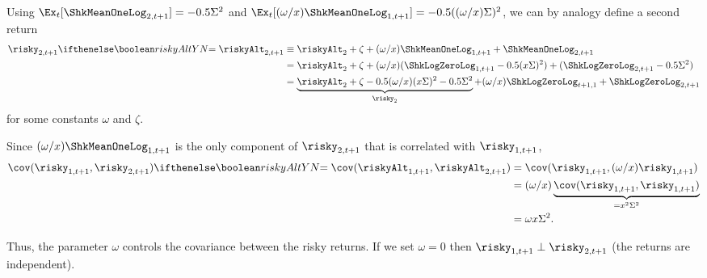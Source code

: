 Using $\Ex_{t}[\ShkMeanOneLog_{2,t+1}] = -0.5 \sigAll^{2}$ and $\Ex_{t}[(\omega/\scale)\ShkMeanOneLog_{1,t+1}] = -0.5 ((\omega/\scale)\sigAll)^{2}$, we can by analogy define a second return
\begin{equation}\begin{gathered}\begin{aligned}
   \risky_{2,t+1} \ifriskyAlt{= \riskyAlt_{2,t+1}}{} & \equiv  \riskyAlt_{2}+\zeta + (\omega /\scale) \ShkMeanOneLog_{1,t+1} + \ShkMeanOneLog_{2,t+1} \label{eq:r2tp1CheckDef}
\\ & =  \riskyAlt_{2}+\zeta + (\omega /\scale) (\ShkLogZeroLog_{1,t+1}-0.5(\scale \sigAll)^{2}) + (\ShkLogZeroLog_{2,t+1}-0.5 \sigAll^{2})
\\ & =  \underbrace{\riskyAlt_{2}+\zeta -0.5 (\omega/\scale)(\scale \sigAll)^2-0.5 \sigAll^{2}}_{\risky_{2}}+(\omega /\scale) \ShkLogZeroLog_{t+1,1}  + \ShkLogZeroLog_{2,t+1} %
\end{aligned}\end{gathered}\end{equation}
for some constants $\omega$ and $\zeta$.

Since $(\omega/\scale)\ShkMeanOneLog_{1,t+1} $ is the only component of ${\risky}_{2,t+1}$ that is correlated with ${\risky}_{1,t+1}$,
\begin{equation*}\begin{gathered}\begin{aligned}
  \cov({\risky}_{1,t+1} ,{\risky}_{2,t+1})\ifriskyAlt{=  \cov(\riskyAlt_{1,t+1} ,\riskyAlt_{2,t+1})}{} & =  \cov({\risky}_{1,t+1} , (\omega/\scale){\risky}_{1,t+1} )
\\ & =  (\omega /\scale ) \underbrace{\cov({\risky}_{1,t+1} ,{\risky}_{1,t+1} )}_{=\scale^{2}\sigAll^{2}}
\\ & =  \omega \scale \sigAll^{2} \label{eq:Cov}
.
\end{aligned}\end{gathered}\end{equation*}

Thus, the parameter $\omega$ controls the covariance between the risky returns.  If we set $\omega = 0$ then $\risky_{1,t+1} \perp \risky_{2,t+1}$ (the returns are independent).

